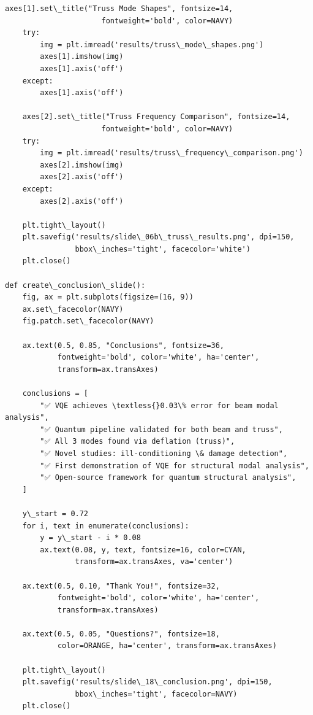 \documentclass[12pt, a4paper]{article}
\begin{document}
\begin{lstlisting}[style=codestyle, caption={{generate_presentation.py --- Slide Generator}}]
    axes[1].set\_title("Truss Mode Shapes", fontsize=14,
                      fontweight='bold', color=NAVY)
    try:
        img = plt.imread('results/truss\_mode\_shapes.png')
        axes[1].imshow(img)
        axes[1].axis('off')
    except:
        axes[1].axis('off')

    axes[2].set\_title("Truss Frequency Comparison", fontsize=14,
                      fontweight='bold', color=NAVY)
    try:
        img = plt.imread('results/truss\_frequency\_comparison.png')
        axes[2].imshow(img)
        axes[2].axis('off')
    except:
        axes[2].axis('off')

    plt.tight\_layout()
    plt.savefig('results/slide\_06b\_truss\_results.png', dpi=150,
                bbox\_inches='tight', facecolor='white')
    plt.close()

def create\_conclusion\_slide():
    fig, ax = plt.subplots(figsize=(16, 9))
    ax.set\_facecolor(NAVY)
    fig.patch.set\_facecolor(NAVY)

    ax.text(0.5, 0.85, "Conclusions", fontsize=36,
            fontweight='bold', color='white', ha='center',
            transform=ax.transAxes)

    conclusions = [
        "✅ VQE achieves \textless{}0.03\% error for beam modal analysis",
        "✅ Quantum pipeline validated for both beam and truss",
        "✅ All 3 modes found via deflation (truss)",
        "✅ Novel studies: ill-conditioning \& damage detection",
        "✅ First demonstration of VQE for structural modal analysis",
        "✅ Open-source framework for quantum structural analysis",
    ]

    y\_start = 0.72
    for i, text in enumerate(conclusions):
        y = y\_start - i * 0.08
        ax.text(0.08, y, text, fontsize=16, color=CYAN,
                transform=ax.transAxes, va='center')

    ax.text(0.5, 0.10, "Thank You!", fontsize=32,
            fontweight='bold', color='white', ha='center',
            transform=ax.transAxes)

    ax.text(0.5, 0.05, "Questions?", fontsize=18,
            color=ORANGE, ha='center', transform=ax.transAxes)

    plt.tight\_layout()
    plt.savefig('results/slide\_18\_conclusion.png', dpi=150,
                bbox\_inches='tight', facecolor=NAVY)
    plt.close()



\end{lstlisting}
\end{document}
